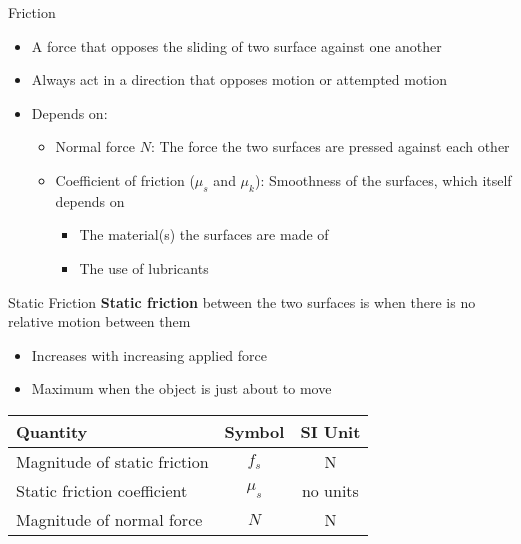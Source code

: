\documentclass[12pt,compress,aspectratio=169]{beamer}
\begin{document}
\begin{frame}{Friction}
  \begin{itemize}
  \item A force that opposes the sliding of two surface against one another
  \item Always act in a direction that opposes motion or attempted motion
  \item Depends on:
    \begin{itemize}
    \item Normal force $N$: The force the two surfaces are pressed against
      each other
    \item Coefficient of friction ($\mu_s$ and $\mu_k$): Smoothness of the
      surfaces, which itself depends on
      \begin{itemize}
      \item The material(s) the surfaces are made of
      \item The use of lubricants
      \end{itemize}
    \end{itemize}
  \end{itemize}
  \begin{center}
    \vspace{-.1in}
  \end{center}
\end{frame}



\begin{frame}{Static Friction}
  \textbf{Static friction} between the two surfaces is when there is no
  relative motion between them
  \begin{itemize}
  \item Increases with increasing applied force
  \item Maximum when the object is just about to move
  \end{itemize}

  \begin{center}
    \begin{tabular}{l|c|c}
      \rowcolor{pink}
      \textbf{Quantity} & \textbf{Symbol} & \textbf{SI Unit} \\ \hline
      Magnitude of static friction & $f_s$ & \si\newton \\
      Static friction coefficient  & $\mu_s$ & no units \\
      Magnitude of normal force    & $N$ & \si\newton
    \end{tabular}
  \end{center}
\end{frame}
\end{document}
